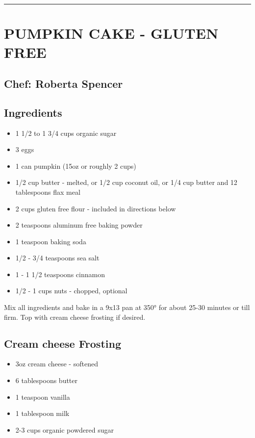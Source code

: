 \documentclass[
]{book}
\providecommand{\tightlist}{%
  \setlength{\itemsep}{0pt}\setlength{\parskip}{0pt}}
\begin{document}
\begin{center}\rule{0.5\linewidth}{0.5pt}\end{center}

\hypertarget{pumpkin-cake---gluten-free}{%
\section*{PUMPKIN CAKE - GLUTEN FREE}\label{pumpkin-cake---gluten-free}}


\hypertarget{chef-roberta-spencer-31}{%
\subsection*{Chef: Roberta Spencer}\label{chef-roberta-spencer-31}}


\hypertarget{ingredients-90}{%
\subsection*{Ingredients}\label{ingredients-90}}


\begin{itemize}
\tightlist
\item
  1 1/2 to 1 3/4 cups organic sugar
\item
  3 eggs
\item
  1 can pumpkin (15oz or roughly 2 cups)
\item
  1/2 cup butter - melted, or 1/2 cup coconut oil, or 1/4 cup butter and 12 tablespoons flax meal
\item
  2 cups gluten free flour - included in directions below
\item
  2 teaspoons aluminum free baking powder
\item
  1 teaspoon baking soda
\item
  1/2 - 3/4 teaspoons sea salt
\item
  1 - 1 1/2 teaspoons cinnamon
\item
  1/2 - 1 cups nuts - chopped, optional
\end{itemize}

Mix all ingredients and bake in a 9x13 pan at 350° for about 25-30 minutes or till firm. Top with cream cheese frosting if desired.

\hypertarget{cream-cheese-frosting}{%
\subsection*{Cream cheese Frosting}\label{cream-cheese-frosting}}


\begin{itemize}
\tightlist
\item
  3oz cream cheese - softened
\item
  6 tablespoons butter
\item
  1 teaspoon vanilla
\item
  1 tablespoon milk
\item
  2-3 cups organic powdered sugar
\end{itemize}
\end{document}
